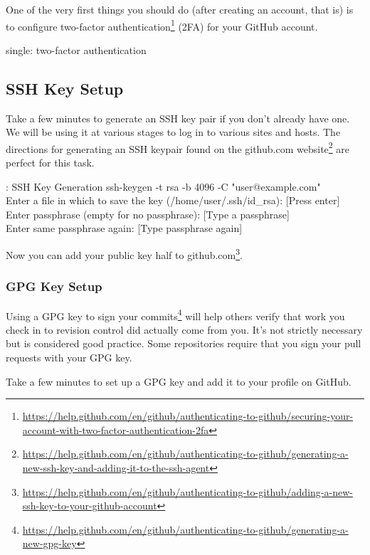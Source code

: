 \justify
One of the very first things you should do (after creating an account,
that is) is to configure two-factor authentication\footnote{\url{https://help.github.com/en/github/authenticating-to-github/securing-your-account-with-two-factor-authentication-2fa}}
(2FA) for your GitHub account.

single: two-factor authentication

\subsection{SSH Key Setup}

Take a few minutes to generate an SSH key pair if you don't already have
one. We will be using it at various stages to log in to various sites
and hosts. The directions for generating an SSH keypair found on the
github.com website\footnote{\url{https://help.github.com/en/github/authenticating-to-github/generating-a-new-ssh-key-and-adding-it-to-the-ssh-agent}}
are perfect for this task.

\begin{mybox}{\thetcbcounter: SSH Key Generation}
ssh-keygen -t rsa -b 4096 -C "user@example.com"\\
Enter a file in which to save the key (/home/user/.ssh/id\_rsa): [Press enter]\\
Enter passphrase (empty for no passphrase): [Type a passphrase]\\
Enter same passphrase again: [Type passphrase again]
\end{mybox}

\justify
Now you can add your public key half to github.com\footnote{\url{https://help.github.com/en/github/authenticating-to-github/adding-a-new-ssh-key-to-your-github-account}}.

\subsubsection{GPG Key Setup}

\justify
Using a GPG key to sign your commits\footnote{\url{https://help.github.com/en/github/authenticating-to-github/generating-a-new-gpg-key}}
will help others verify that work you check in to revision control did
actually come from you. It's not strictly necessary but is considered
good practice. Some repositories require that you sign your pull
requests with your GPG key.

\justify
Take a few minutes to set up a GPG key and add it to your profile on
GitHub.

